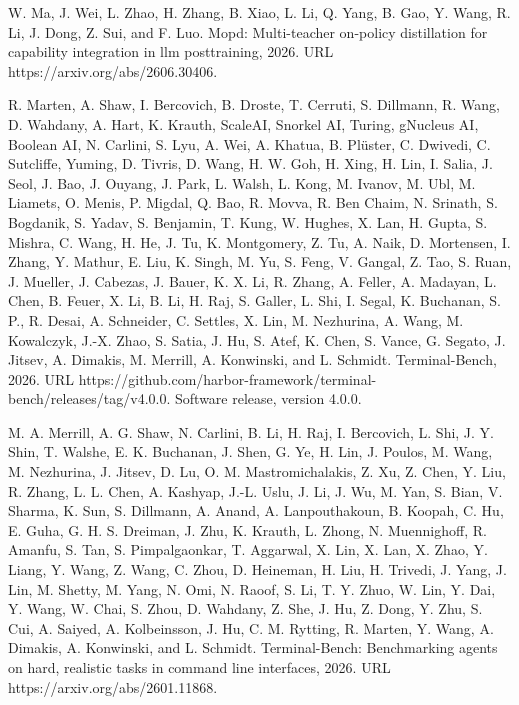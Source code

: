 W. Ma, J. Wei, L. Zhao, H. Zhang, B. Xiao, L. Li, Q. Yang, B. Gao, Y.
Wang, R. Li, J. Dong, Z. Sui, and F. Luo. Mopd: Multi-teacher on-policy
distillation for capability integration in llm posttraining, 2026. URL
https://arxiv.org/abs/2606.30406.

R. Marten, A. Shaw, I. Bercovich, B. Droste, T. Cerruti, S. Dillmann, R.
Wang, D. Wahdany, A. Hart, K. Krauth, ScaleAI, Snorkel AI, Turing,
gNucleus AI, Boolean AI, N. Carlini, S. Lyu, A. Wei, A. Khatua, B.
Plüster, C. Dwivedi, C. Sutcliffe, Yuming, D. Tivris, D. Wang, H. W. Goh,
H. Xing, H. Lin, I. Salia, J. Seol, J. Bao, J. Ouyang, J. Park, L.
Walsh, L. Kong, M. Ivanov, M. Ubl, M. Liamets, O. Menis, P. Migdal, Q.
Bao, R. Movva, R. Ben Chaim, N. Srinath, S. Bogdanik, S. Yadav, S.
Benjamin, T. Kung, W. Hughes, X. Lan, H. Gupta, S. Mishra, C. Wang, H.
He, J. Tu, K. Montgomery, Z. Tu, A. Naik, D. Mortensen, I. Zhang, Y.
Mathur, E. Liu, K. Singh, M. Yu, S. Feng, V. Gangal, Z. Tao, S. Ruan, J.
Mueller, J. Cabezas, J. Bauer, K. X. Li, R. Zhang, A. Feller, A.
Madayan, L. Chen, B. Feuer, X. Li, B. Li, H. Raj, S. Galler, L. Shi, I.
Segal, K. Buchanan, S. P., R. Desai, A. Schneider, C. Settles, X. Lin,
M. Nezhurina, A. Wang, M. Kowalczyk, J.-X. Zhao, S. Satia, J. Hu, S.
Atef, K. Chen, S. Vance, G. Segato, J. Jitsev, A. Dimakis, M. Merrill,
A. Konwinski, and L. Schmidt. Terminal-Bench, 2026. URL
https://github.com/harbor-framework/terminal-bench/releases/tag/v4.0.0.
Software release, version 4.0.0.

M. A. Merrill, A. G. Shaw, N. Carlini, B. Li, H. Raj, I. Bercovich, L.
Shi, J. Y. Shin, T. Walshe, E. K. Buchanan, J. Shen, G. Ye, H. Lin, J.
Poulos, M. Wang, M. Nezhurina, J. Jitsev, D. Lu, O. M. Mastromichalakis,
Z. Xu, Z. Chen, Y. Liu, R. Zhang, L. L. Chen, A. Kashyap, J.-L. Uslu, J.
Li, J. Wu, M. Yan, S. Bian, V. Sharma, K. Sun, S. Dillmann, A. Anand, A.
Lanpouthakoun, B. Koopah, C. Hu, E. Guha, G. H. S. Dreiman, J. Zhu, K.
Krauth, L. Zhong, N. Muennighoff, R. Amanfu, S. Tan, S. Pimpalgaonkar, T.
Aggarwal, X. Lin, X. Lan, X. Zhao, Y. Liang, Y. Wang, Z. Wang, C. Zhou,
D. Heineman, H. Liu, H. Trivedi, J. Yang, J. Lin, M. Shetty, M. Yang, N.
Omi, N. Raoof, S. Li, T. Y. Zhuo, W. Lin, Y. Dai, Y. Wang, W. Chai, S.
Zhou, D. Wahdany, Z. She, J. Hu, Z. Dong, Y. Zhu, S. Cui, A. Saiyed, A.
Kolbeinsson, J. Hu, C. M. Rytting, R. Marten, Y. Wang, A. Dimakis, A.
Konwinski, and L. Schmidt. Terminal-Bench: Benchmarking agents on hard,
realistic tasks in command line interfaces, 2026. URL
https://arxiv.org/abs/2601.11868.


